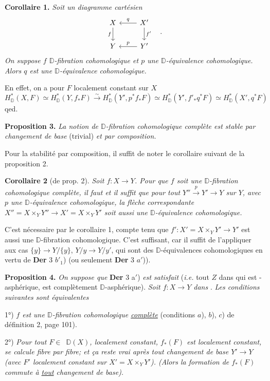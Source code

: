 \documentclass[11pt,leqno]{article}
\newcommand{\printedpage}[1]{\marginpar{\footnotesize p.~#1}}
\newcommand{\msp}[1]{\marginpar{\footnotesize [#1]}}
\newcommand{\DD}{\mathbb{D}}
\newcommand{\Dia}{\mathsf{Dia}}
\newcommand{\Ob}{\mathsf{Ob}}
\newcommand{\Hot}{\mathsf{Hot}}
\begin{document}
\textbf{Corollaire 1.} \textit{Soit un diagramme cartésien}
\[
\begin{tikzcd}
X & X' \arrow[l, "q"'] \arrow[d, "f'"] \\
Y & Y' \arrow[l, "p"']
\arrow[from=1-1, to=2-1, "f"']
\end{tikzcd}
\quad .
\]
\textit{On suppose $f$ $\DD$-fibration cohomologique et $p$ une $\DD$-équivalence cohomologique. Alors $q$ est une $\DD$-équivalence cohomologique.}

\msp{page 103}
En effet, on a pour $F$ localement constant sur $X$
\[
H^*_{\DD}(X,F) \simeq H^*_{\DD}(Y, f_*F) \overset{\sim}{\longrightarrow} H^*_{\DD}(Y', p^*f_*F) \simeq H^*_{\DD}(Y', f'_*q^*F) \simeq H^*_{\DD}(X', q^*F)
\]
qed.

\textbf{Proposition 3.} \textit{La notion de $\DD$-fibration cohomologique complète est stable par changement de base} (trivial) \textit{et par composition.}

Pour la stabilité par composition, il suffit de noter le corollaire suivant de la proposition 2.

\textbf{Corollaire 2} (de prop. 2). \textit{Soit $f : X \to Y$. Pour que $f$ soit une $\DD$-fibration cohomologique complète, il faut et il suffit que pour tout $Y'' \overset{p}{\to} Y' \to Y$ sur $Y$, avec $p$ une $\DD$-équivalence cohomologique, la flèche correspondante $X'' = X \times_Y Y'' \longrightarrow X' = X \times_Y Y'$ soit aussi une $\DD$-équivalence cohomologique.}

C’est nécessaire par le corollaire 1, compte tenu que $f' : X' = X \times_Y Y' \to Y'$ est aussi une $\DD$-fibration cohomologique. C’est suffisant, car il suffit de l’appliquer aux cas $\{y\} \to Y/\{y\}$, $Y/y \to Y/y'$, qui sont des $\DD$-équivalences cohomologiques en
\msp{page 104}
vertu de \textbf{Der} 3 $b'_1$) (ou seulement \textbf{Der} 3 $a'$)).

\printedpage{63}

\textbf{Proposition 4.} \textit{On suppose que} \textbf{Der} 3 a$'$) \textit{est satisfait} (\textit{i.e.} tout $Z$ dans \Dia{} qui est \Hot-asphérique, est complètement $\DD$-asphérique). \textit{Soit $f : X \to Y$ dans} \Dia. \textit{Les conditions suivantes sont équivalentes}

1°) \textit{$f$ est une $\DD$-fibration cohomologique \underline{complète}} (conditions $a$), $b$), $c$) de définition 2, page 101).

2°) \textit{Pour tout $F \in$} \Ob\,$\DD(X)$\textit{, localement constant, $f_*(F)$ est localement constant, se calcule fibre par fibre; et ça reste vrai après tout changement de base $Y' \to Y$ (avec $F'$ localement constant sur $X' = X \times_Y Y'$). (Alors la formation de $f_*(F)$ commute à \underline{tout} changement de base).}
\end{document}

